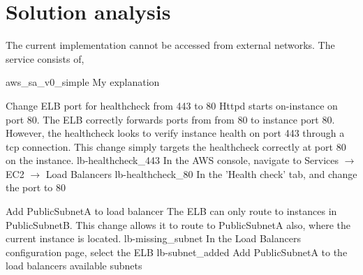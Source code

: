 \FloatBarrier

\section{Solution analysis}

The current implementation cannot be accessed from external networks. The service consists of,


\imagefigsingle
{aws_sa_v0_simple}
{My explanation}

\FloatBarrier

{Change ELB port for healthcheck from 443 to 80}
{
	Httpd starts on-instance on port 80. The ELB correctly forwards ports
	from from 80 to instance port 80.  However, the healthcheck looks to verify instance health on port 443 through a tcp connection. This change simply targets the healthcheck correctly at port 80 on the instance.
}
{
	\imagefigdual
	{lb-healthcheck_443}
	{In the AWS console, navigate to Services  $\rightarrow$ EC2  $\rightarrow$ Load Balancers}
	{lb-healthcheck_80}
	{In the 'Health check' tab, and change the port to $80$}
}

\FloatBarrier


{Add PublicSubnetA to load balancer}
{
	The ELB can only route to instances in PublicSubnetB. This change
	allows it to route to PublicSubnetA also, where the current instance is located.
}
{
	\imagefigdual
	{lb-missing_subnet}
	{In the Load Balancers configuration page, select the ELB}
	{lb-subnet_added}
	{Add PublicSubnetA to the load balancers available subnets}
}

